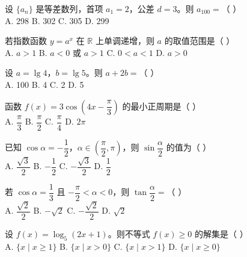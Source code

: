 \documentclass[11pt, a4paper]{article}
\begin{document}
\begin{baitap}[6]
设 $\{a_n\}$ 是等差数列，首项 $a_1=2$，公差 $d=3$。则 $a_{100}=$（ ）\\[4pt]
A. 298 \quad B. 302 \quad C. 305 \quad D. 299
\end{baitap}

\begin{baitap}[7]
若指数函数 $y=a^x$ 在 $\mathbb{R}$ 上单调递增，则 $a$ 的取值范围是（ ）\\[4pt]
A. $a>1$ \quad B. $a<0$ 或 $a>1$ \quad C. $0<a<1$ \quad D. $a>0$
\end{baitap}

\begin{baitap}[8]
设 $a=\lg 4$，$b=\lg 5$。则 $a+2b=$（ ）\\[4pt]
A. 100 \quad B. 4 \quad C. 2 \quad D. 5
\end{baitap}

\begin{baitap}[9]
函数 $f(x)=3\cos\left(4x-\dfrac{\pi}{3}\right)$ 的最小正周期是（ ）\\[4pt]
A. $\dfrac{\pi}{3}$ \quad B. $\dfrac{\pi}{2}$ \quad C. $\dfrac{\pi}{4}$ \quad D. $2\pi$
\end{baitap}

\begin{baitap}[10]
已知 $\cos\alpha=-\dfrac{1}{2}$，$\alpha\in\left(\dfrac{\pi}{2},\pi\right)$，则 $\sin\dfrac{\alpha}{2}$ 的值为（ ）\\[4pt]
A. $\dfrac{\sqrt{3}}{2}$ \quad B. $-\dfrac{1}{2}$ \quad C. $-\dfrac{\sqrt{3}}{2}$ \quad D. $\dfrac{1}{2}$
\end{baitap}

\begin{baitap}[11]
若 $\cos\alpha=\dfrac{1}{3}$ 且 $-\dfrac{\pi}{2}<\alpha<0$，则 $\tan\dfrac{\alpha}{2}=$（ ）\\[4pt]
A. $\dfrac{\sqrt{2}}{2}$ \quad B. $-\sqrt{2}$ \quad C. $-\dfrac{\sqrt{2}}{2}$ \quad D. $\sqrt{2}$
\end{baitap}

\begin{baitap}[12]
设 $f(x)=\log_5(2x+1)$。则不等式 $f(x)\ge 0$ 的解集是（ ）\\[4pt]
A. $\{x \mid x\ge 1\}$ \quad B. $\{x \mid x>0\}$ \quad C. $\{x \mid x>1\}$ \quad D. $\{x \mid x\ge 0\}$
\end{baitap}

\clearpage
{}
\end{document}
